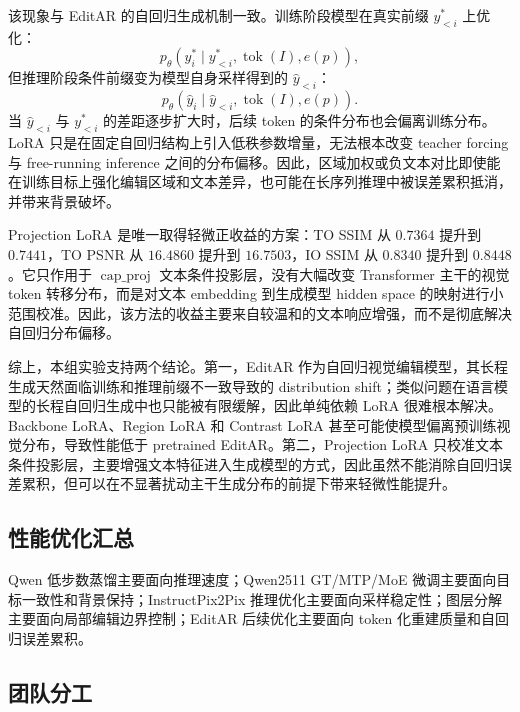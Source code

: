 \documentclass[UTF8,11pt,a4paper,fontset=fandol]{ctexart}
\begin{document}
该现象与 EditAR 的自回归生成机制一致。训练阶段模型在真实前缀 \(y_{<i}^{\ast}\) 上优化：
\[
p_{\theta}(y_i^\ast\mid y_{<i}^{\ast},\operatorname{tok}(I),e(p)),
\]
但推理阶段条件前缀变为模型自身采样得到的 \(\hat{y}_{<i}\)：
\[
p_{\theta}(\hat{y}_i\mid \hat{y}_{<i},\operatorname{tok}(I),e(p)).
\]
当 \(\hat{y}_{<i}\) 与 \(y_{<i}^{\ast}\) 的差距逐步扩大时，后续 token 的条件分布也会偏离训练分布。LoRA 只是在固定自回归结构上引入低秩参数增量，无法根本改变 teacher forcing 与 free-running inference 之间的分布偏移。因此，区域加权或负文本对比即使能在训练目标上强化编辑区域和文本差异，也可能在长序列推理中被误差累积抵消，并带来背景破坏。

Projection LoRA 是唯一取得轻微正收益的方案：TO SSIM 从 \(0.7364\) 提升到 \(0.7441\)，TO PSNR 从 \(16.4860\) 提升到 \(16.7503\)，IO SSIM 从 \(0.8340\) 提升到 \(0.8448\)。它只作用于 \(\operatorname{cap\_proj}\) 文本条件投影层，没有大幅改变 Transformer 主干的视觉 token 转移分布，而是对文本 embedding 到生成模型 hidden space 的映射进行小范围校准。因此，该方法的收益主要来自较温和的文本响应增强，而不是彻底解决自回归分布偏移。

综上，本组实验支持两个结论。第一，EditAR 作为自回归视觉编辑模型，其长程生成天然面临训练和推理前缀不一致导致的 distribution shift；类似问题在语言模型的长程自回归生成中也只能被有限缓解，因此单纯依赖 LoRA 很难根本解决。Backbone LoRA、Region LoRA 和 Contrast LoRA 甚至可能使模型偏离预训练视觉分布，导致性能低于 pretrained EditAR。第二，Projection LoRA 只校准文本条件投影层，主要增强文本特征进入生成模型的方式，因此虽然不能消除自回归误差累积，但可以在不显著扰动主干生成分布的前提下带来轻微性能提升。


\subsection{性能优化汇总}

Qwen 低步数蒸馏主要面向推理速度；Qwen2511 GT/MTP/MoE 微调主要面向目标一致性和背景保持；InstructPix2Pix 推理优化主要面向采样稳定性；图层分解主要面向局部编辑边界控制；EditAR 后续优化主要面向 token 化重建质量和自回归误差累积。

\subsection{团队分工}
\end{document}
